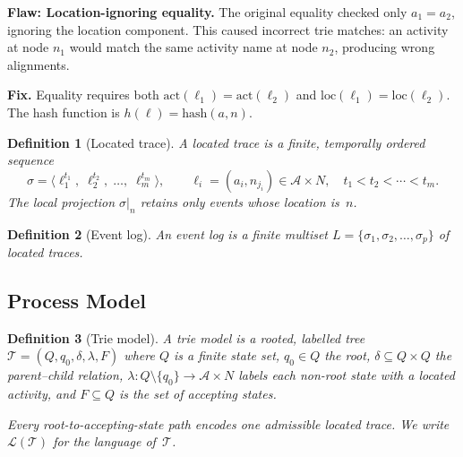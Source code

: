\documentclass[11pt,a4paper]{article}
\newtheorem{definition}{Definition}
\newcommand{\A}{\mathcal{A}}
\newcommand{\loc}{\mathrm{loc}}
\newcommand{\act}{\mathrm{act}}
\newcommand{\Nodes}{N}
\newcommand{\T}{\mathcal{T}}
\newcommand{\Lg}{\mathcal{L}}
\newcommand{\trace}{\sigma}
\begin{document}
\begin{oldbox}
\textbf{Flaw: Location-ignoring equality.}\;
The original equality checked only $a_1 = a_2$, ignoring the location
component.  This caused incorrect trie matches: an activity at node
$n_1$ would match the same activity name at node $n_2$, producing
wrong alignments.
\end{oldbox}

\begin{newboxelem}
\textbf{Fix.}\;
Equality requires both $\act(\ell_1) = \act(\ell_2)$ and
$\loc(\ell_1) = \loc(\ell_2)$.
The hash function is $h(\ell) = \mathrm{hash}(a, n)$.
\end{newboxelem}

\begin{definition}[Located trace]\label{def:located-trace}
  A \emph{located trace} is a finite, temporally ordered sequence
  \[
    \trace = \bigl\langle
      \ell_1^{t_1},\;
      \ell_2^{t_2},\;
      \ldots,\;
      \ell_m^{t_m}
    \bigr\rangle,
    \qquad
    \ell_i = (a_i, n_{j_i}) \in \A \times \Nodes,
    \quad
    t_1 < t_2 < \cdots < t_m.
  \]
  The \emph{local projection} $\trace|_{n}$ retains only events
  whose location is~$n$.
\end{definition}

\begin{definition}[Event log]\label{def:event-log}
  An \emph{event log} is a finite multiset
  $L = \{\trace_1, \trace_2, \ldots, \trace_p\}$
  of located traces.
\end{definition}

\subsection{Process Model}

\begin{definition}[Trie model]\label{def:trie}
  A \emph{trie model} is a rooted, labelled tree
  $\T = (Q, q_0, \delta, \lambda, F)$
  where $Q$ is a finite state set, $q_0 \in Q$ the root,
  $\delta \subseteq Q \times Q$ the parent--child relation,
  $\lambda\colon Q \setminus \{q_0\} \to \A \times \Nodes$ labels each
  non-root state with a located activity, and
  $F \subseteq Q$ is the set of \emph{accepting states}.

  Every root-to-accepting-state path encodes one admissible
  located trace.  We write $\Lg(\T)$ for the \emph{language} of~$\T$.
\end{definition}
\end{document}
